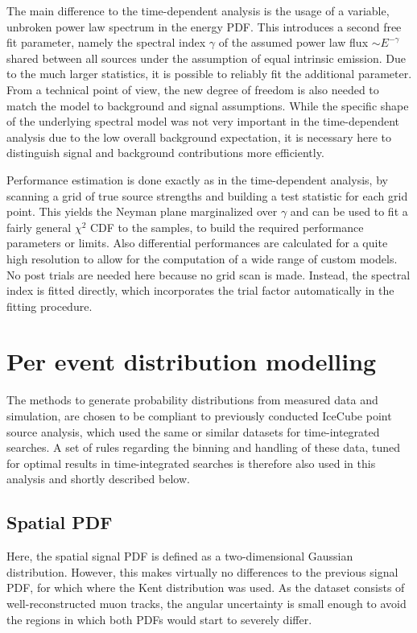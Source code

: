 The main difference to the time-dependent analysis is the usage of a variable, unbroken power law spectrum in the energy PDF.
This introduces a second free fit parameter, namely the spectral index $\gamma$ of the assumed power law flux $\sim E^{-\gamma}$ shared between all sources under the assumption of equal intrinsic emission.
Due to the much larger statistics, it is possible to reliably fit the additional parameter.
From a technical point of view, the new degree of freedom is also needed to match the model to background and signal assumptions.
While the specific shape of the underlying spectral model was not very important in the time-dependent analysis due to the low overall background expectation, it is necessary here to distinguish signal and background contributions more efficiently.

Performance estimation is done exactly as in the time-dependent analysis, by scanning a grid of true source strengths and building a test statistic for each grid point.
This yields the Neyman plane marginalized over $\gamma$ and can be used to fit a fairly general $\chi^2$ CDF to the samples, to build the required performance parameters or limits.
Also differential performances are calculated for a quite high resolution to allow for the computation of a wide range of custom models.
No post trials are needed here because no grid scan is made.
Instead, the spectral index is fitted directly, which incorporates the trial factor automatically in the fitting procedure.


\section{Per event distribution modelling}
The methods to generate probability distributions from measured data and simulation, are chosen to be compliant to previously conducted IceCube point source analysis, which used the same or similar datasets for time-integrated searches.
A set of rules regarding the binning and handling of these data, tuned for optimal results in time-integrated searches is therefore also used in this analysis and shortly described below.

\subsection*{Spatial PDF}
Here, the spatial signal PDF is defined as a two-dimensional Gaussian distribution.
However, this makes virtually no differences to the previous signal PDF, for which where the Kent distribution was used.
As the dataset consists of well-reconstructed muon tracks, the angular uncertainty is small enough to avoid the regions in which both PDFs would start to severely differ.

